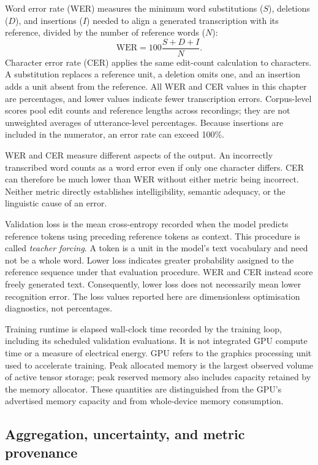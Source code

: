 \documentclass[12pt,a4paper]{report}
\begin{document}
Word error rate (WER) measures the minimum word substitutions ($S$), deletions ($D$), and insertions ($I$) needed to align a generated transcription with its reference, divided by the number of reference words ($N$):
\begin{equation}
  \mathrm{WER}=100\frac{S+D+I}{N}.
\end{equation}
Character error rate (CER) applies the same edit-count calculation to characters. A substitution replaces a reference unit, a deletion omits one, and an insertion adds a unit absent from the reference. All WER and CER values in this chapter are percentages, and lower values indicate fewer transcription errors. Corpus-level scores pool edit counts and reference lengths across recordings; they are not unweighted averages of utterance-level percentages. Because insertions are included in the numerator, an error rate can exceed 100\%.

WER and CER measure different aspects of the output. An incorrectly transcribed word counts as a word error even if only one character differs. CER can therefore be much lower than WER without either metric being incorrect. Neither metric directly establishes intelligibility, semantic adequacy, or the linguistic cause of an error.

Validation loss is the mean cross-entropy recorded when the model predicts reference tokens using preceding reference tokens as context. This procedure is called \emph{teacher forcing}. A token is a unit in the model's text vocabulary and need not be a whole word. Lower loss indicates greater probability assigned to the reference sequence under that evaluation procedure. WER and CER instead score freely generated text. Consequently, lower loss does not necessarily mean lower recognition error. The loss values reported here are dimensionless optimisation diagnostics, not percentages.

Training runtime is elapsed wall-clock time recorded by the training loop, including its scheduled validation evaluations. It is not integrated GPU compute time or a measure of electrical energy. GPU refers to the graphics processing unit used to accelerate training. Peak allocated memory is the largest observed volume of active tensor storage; peak reserved memory also includes capacity retained by the memory allocator. These quantities are distinguished from the GPU's advertised memory capacity and from whole-device memory consumption.

\subsection{Aggregation, uncertainty, and metric provenance}
\end{document}
